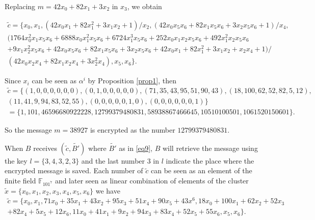 \documentclass[12pt,a4paper]{article}
\begin{document}
Replacing $m=42x_0 + 82x_1+3x_2$ in $x_3$, we obtain

\begin{equation*}
\begin{array}{l}
\tilde{c}=\lbrace x_0, x_1, (42x_0x_1+82x_1^2+3x_1x_2+1)/x_2, (42x_0x_5x_6+82x_1x_5x_6 + 3x_2x_5x_6+1)/x_4, \\

(1764x_0^2x_1x_5x_6+6888x_0x_1^2x_5x_6+6724x_1^3x_5x_6 +252x_0x_1x_2x_5x_6 +492x_1^2x_2x_5x_6 \\
+9x_1x_2^2x_5x_6 +42x_0x_5x_6+82x_1x_5x_6 +3x_2x_5x_6 +42x_0x_1+82x_1^2+3x_1x_2+x_2x_4+1)/ \\
(42x_0x_2x_4+82x_1x_2x_4+3x_2^2x_4), x_5, x_6 \rbrace.
\end{array} 
\end{equation*}

Since $x_i$ can be  seen as $\alpha^i$ by Proposition \ref{prop1}, then
\begin{equation*}
\begin{array}{l}
\tilde{c} =\lbrace (1,0,0,0,0,0,0), (0,1,0,0,0,0,0), (71,35,43,95,51,90,43), (18,100,62,52,82,5,12), \\(11,41,9,94,83,52,55),(0,0,0,0,0,1,0), (0,0,0,0,0,0,1)  \rbrace \\
 = \lbrace 1,101,46 596 680 922 228 , 12 799 379 480 831,58 938 867 466 645, 10 510 100 501, 1 061 520 150 601 \rbrace.
\end{array} 
\end{equation*}

So the message $m=38927$ is encrypted as the number $12 799 379 480 831$. 

When $B$ receives $(\tilde{c},\tilde{B'})$ where $\tilde{B'}$ as in \ref{eq9}, $B$ will retrieve the message using the key $l= \{ 3,4,3,2,3 \}$ and the last number 3 in $l$ indicate the place where the encrypted message is saved. Each number of $\tilde{c}$ can be seen as an element of the finite field $\mathbb{F}_{101^7}$ and later seen as linear combination of elements of the cluster $\tilde{x}= \{ x_0,x_1,x_2,x_3,x_4,x_5,x_6 \}$ we have 
\begin{equation*}
\begin{array}{l}
\tilde{c} =  \{ x_0,x_1,71x_0+35x_1+43x_2+95x_3+51x_4+90x_5+43x^6,18x_0+100x_1+62x_2+52x_3 \\
+82x_4+5x_5+12x_6,11x_0+41x_1+9x_2+94x_3+83x_4+52x_5+55x_6,x_5,x_6  \}.
\end{array} 
\end{equation*}
\end{document}
